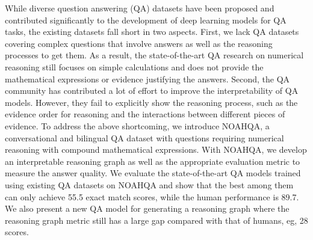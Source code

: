 While diverse question answering (QA) datasets have been proposed and contributed significantly to the development of deep learning models for QA tasks, the existing datasets fall short in two aspects. First, we lack QA datasets covering complex questions that involve answers as well as the reasoning processes to get them. As a result, the state-of-the-art QA research on numerical reasoning still focuses on simple calculations and does not provide the mathematical expressions or evidence justifying the answers. Second, the QA community has contributed a lot of effort to improve the interpretability of QA models. However, they fail to explicitly show the reasoning process, such as the evidence order for reasoning and the interactions between different pieces of evidence. To address the above shortcoming, we introduce NOAHQA, a conversational and bilingual QA dataset with questions requiring numerical reasoning with compound mathematical expressions. With NOAHQA, we develop an interpretable reasoning graph as well as the appropriate evaluation metric to measure the answer quality.  We evaluate the state-of-the-art QA models trained using existing QA datasets on NOAHQA and show that the best among them can only achieve 55.5 exact match scores, while the human performance is 89.7. We also present a new QA model for generating a reasoning graph where the reasoning graph metric still has a large gap compared with that of humans, eg, 28 scores.
